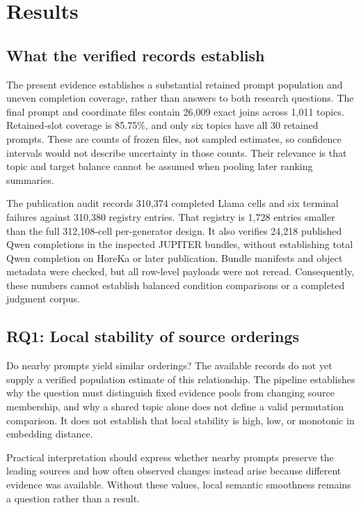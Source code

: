 \section{Results}
\label{sec:results}
\subsection{What the verified records establish}
The present evidence establishes a substantial retained prompt population and uneven completion coverage, rather than answers to both research questions. The final prompt and coordinate files contain 26,009 exact joins across 1,011 topics. Retained-slot coverage is 85.75\%, and only six topics have all 30 retained prompts. These are counts of frozen files, not sampled estimates, so confidence intervals would not describe uncertainty in those counts. Their relevance is that topic and target balance cannot be assumed when pooling later ranking summaries.

The publication audit records 310,374 completed Llama cells and six terminal failures against 310,380 registry entries. That registry is 1,728 entries smaller than the full 312,108-cell per-generator design. It also verifies 24,218 published Qwen completions in the inspected JUPITER bundles, without establishing total Qwen completion on HoreKa or later publication. Bundle manifests and object metadata were checked, but all row-level payloads were not reread.  Consequently, these numbers cannot establish balanced condition comparisons or a completed judgment corpus.

\subsection{RQ1: Local stability of source orderings}
\label{sec:local}
Do nearby prompts yield similar orderings? The available records do not yet supply a verified population estimate of this relationship. The pipeline establishes why the question must distinguish fixed evidence pools from changing source membership, and why a shared topic alone does not define a valid permutation comparison. It does not establish that local stability is high, low, or monotonic in embedding distance.

 Practical interpretation should express whether nearby prompts preserve the leading sources and how often observed changes instead arise because different evidence was available. Without these values, local semantic smoothness remains a question rather than a result.

